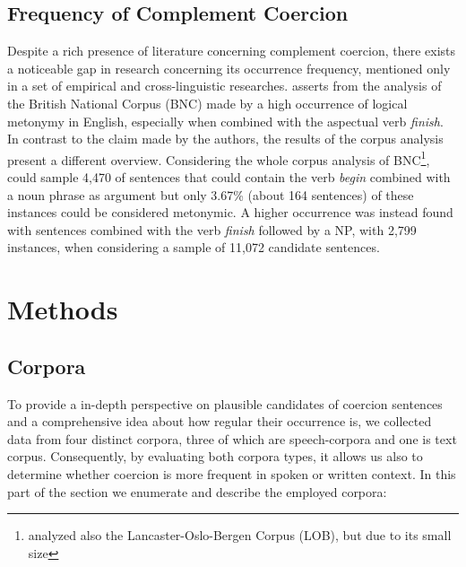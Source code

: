 \documentclass{article}
\begin{document}
\subsection{Frequency of Complement Coercion} %
Despite a rich presence of literature concerning complement coercion, there exists a noticeable gap in research concerning its occurrence frequency, mentioned only in a set of empirical and cross-linguistic researches. \textcite{shutova_logical_2009}  asserts from the analysis of the British National Corpus (BNC) made by \textcite{verspoor_conventionality-governed_1997} a high occurrence of logical metonymy in English, especially when combined with the aspectual verb \emph{finish}. In contrast to the claim made by the authors, the results of the corpus analysis present a different overview. Considering the whole corpus analysis of BNC\footnote{\textcite{verspoor_conventionality-governed_1997} analyzed also the Lancaster-Oslo-Bergen Corpus (LOB), but due to its small size},  
\textcite{verspoor_conventionality-governed_1997} could sample 4,470 of sentences that could contain the verb \emph{begin} combined with a noun phrase as argument but only 3.67\% (about 164 sentences) of these instances could be considered metonymic. A higher occurrence was instead found with sentences combined with the verb \emph{finish} followed by a NP, with 2,799 instances, when considering a sample of 11,072 candidate sentences. %

\section{Methods}
\subsection{Corpora}

To provide a in-depth perspective on plausible candidates of coercion sentences and a comprehensive idea about how regular their occurrence is, we collected data from four distinct corpora, three of which are speech-corpora and one is text corpus. Consequently, by evaluating both corpora types, it allows us also to determine whether coercion is more frequent in spoken or written context. In this part of the section we enumerate and describe the employed 
corpora:
\end{document}
